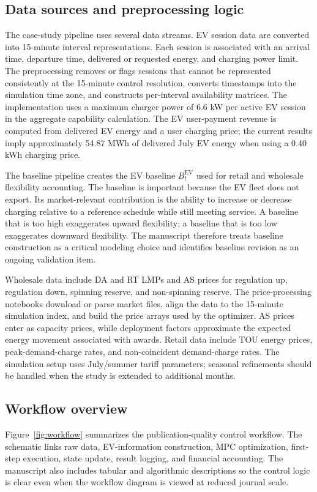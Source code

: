 \documentclass[final,5p,times]{elsarticle}
\newcommand{\EV}{\mathrm{EV}}
\begin{document}
\subsection{Data sources and preprocessing logic}
The case-study pipeline uses several data streams. EV session data are converted into 15-minute interval representations. Each session is associated with an arrival time, departure time, delivered or requested energy, and charging power limit. The preprocessing removes or flags sessions that cannot be represented consistently at the 15-minute control resolution, converts timestamps into the simulation time zone, and constructs per-interval availability matrices. The implementation uses a maximum charger power of 6.6 kW per active EV session in the aggregate capability calculation. The EV user-payment revenue is computed from delivered EV energy and a user charging price; the current results imply approximately 54.87 MWh of delivered July EV energy when using a 0.40 \/kWh charging price.

The baseline pipeline creates the EV baseline $B_t^{\EV}$ used for retail and wholesale flexibility accounting. The baseline is important because the EV fleet does not export. Its market-relevant contribution is the ability to increase or decrease charging relative to a reference schedule while still meeting service. A baseline that is too high exaggerates upward flexibility; a baseline that is too low exaggerates downward flexibility. The manuscript therefore treats baseline construction as a critical modeling choice and identifies baseline revision as an ongoing validation item.

Wholesale data include DA and RT LMPs and AS prices for regulation up, regulation down, spinning reserve, and non-spinning reserve. The price-processing notebooks download or parse market files, align the data to the 15-minute simulation index, and build the price arrays used by the optimizer. AS prices enter as capacity prices, while deployment factors approximate the expected energy movement associated with awards. Retail data include TOU energy prices, peak-demand-charge rates, and non-coincident demand-charge rates. The simulation setup uses July/summer tariff parameters; seasonal refinements should be handled when the study is extended to additional months.

\subsection{Workflow overview}
Figure~\ref{fig:workflow} summarizes the publication-quality control workflow. The schematic links raw data, EV-information construction, MPC optimization, first-step execution, state update, result logging, and financial accounting. The manuscript also includes tabular and algorithmic descriptions so the control logic is clear even when the workflow diagram is viewed at reduced journal scale.
\end{document}
